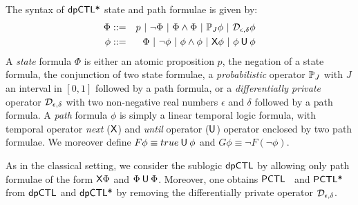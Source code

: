 
The syntax of $\textsf{dpCTL*}$ state and path formulae is given by:
\begin{eqnarray*}
  \Phi & ::= & p \ |\ \neg \Phi \ |\ \Phi \wedge \Phi \ |\
               \PJ{J} \phi \ |\ \dpriv{\epsilon}{\delta} \phi\\
  \phi & ::= & \Phi \ |\ \neg\phi  \ |\  \phi\wedge\phi  \ |\  \X \phi \ |\ \phi \until \phi
\end{eqnarray*}
A \emph{state} formula $\Phi$ is either  an atomic proposition
$p$, the negation of a state formula, the conjunction of two state
formulae, a \emph{probabilistic} operator $\mathbb{P}_{J}$ with $J$
an interval in $[0, 1]$ followed by a path formula, or a
\emph{differentially private} operator $\mathcal{D}_{{\epsilon}, {\delta}}$
 with two non-negative real numbers $\epsilon$ and $\delta$ followed
 by a path formula. A
\emph{path} formula $\phi$ is simply a linear temporal logic formula, with temporal operator \emph{next}  ($\mathsf{X}$)
and  \emph{until} operator
($\mathbin{\mathsf{U}}$) operator enclosed by two path formulae.
We moreover define $F \phi \equiv true \mathbin{\mathsf{U}} \phi$ and $G\phi \equiv \neg F (\neg\phi)$.

As in the classical setting, we consider the sublogic $\textsf{dpCTL}$ by allowing only path formulae of the form $\mathsf{X}\Phi$ and $\Phi\mathbin{\mathsf{U}}\Phi$.
Moreover, one obtains $\textsf{PCTL}$~\cite{HanssonJ94} and $\textsf{PCTL*}$~\cite{BiancoA95} from $\textsf{dpCTL}$ and $\textsf{dpCTL*}$
by removing the differentially private operator  $\mathcal{D}_{{\epsilon}, {\delta}}$.

